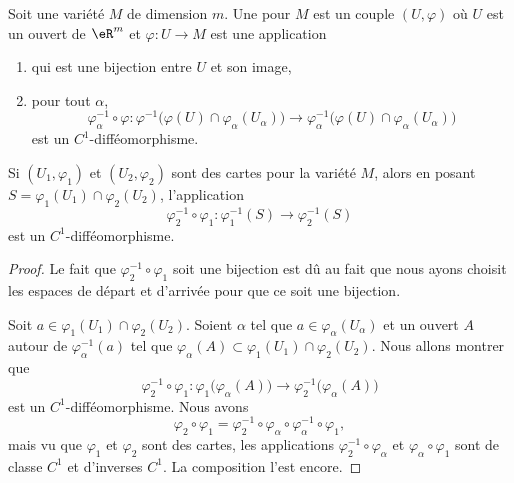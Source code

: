 \begin{definition}
    Soit une variété \( M\) de dimension \( m\). Une  pour \( M\) est un couple \( (U,\varphi)\) où \( U\) est un ouvert de \( \eR^m\) et \( \varphi\colon U\to M\) est une application
    \begin{enumerate}
        \item
            qui est une bijection entre \( U\) et son image,
        \item
    pour tout \( \alpha\),
    \begin{equation}
        \varphi_{\alpha}^{-1}\circ \varphi\colon \varphi^{-1}\big( \varphi(U)\cap\varphi_{\alpha}(U_{\alpha}) \big)\to \varphi_{\alpha}^{-1}\big( \varphi(U)\cap\varphi_{\alpha}(U_{\alpha}) \big)
    \end{equation}
    est un \( C^1\)-difféomorphisme.
    \end{enumerate}
\end{definition}

\begin{proposition}
    Si \( (U_1,\varphi_1)\) et \( (U_2,\varphi_2)\) sont des cartes pour la variété \( M\), alors en posant \( S=\varphi_1(U_1)\cap \varphi_2(U_2)\), l'application
    \begin{equation}
        \varphi_2^{-1}\circ\varphi_1\colon \varphi_1^{-1}(S)\to \varphi_2^{-1}(S)
    \end{equation}
    est un \( C^1\)-difféomorphisme.
\end{proposition}

\begin{proof}
    Le fait que \( \varphi_2^{-1}\circ\varphi_1\) soit une bijection est dû au fait que nous ayons choisit les espaces de départ et d'arrivée pour que ce soit une bijection.

    Soit \( a\in \varphi_1(U_1)\cap\varphi_2(U_2)\). Soient \( \alpha\) tel que \( a\in\varphi_{\alpha}(U_{\alpha})\) et un ouvert \( A\) autour de \( \varphi_{\alpha}^{-1}(a)\) tel que \( \varphi_{\alpha}(A)\subset \varphi_1(U_1)\cap \varphi_2(U_2)\). Nous allons montrer que
    \begin{equation}
        \varphi_2^{-1}\circ \varphi_1\colon \varphi_1\big( \varphi_{\alpha}(A) \big)\to \varphi_2^{-1}\big( \varphi_{\alpha}(A) \big)
    \end{equation}
    est un \( C^1\)-difféomorphisme. Nous avons
    \begin{equation}
        \varphi_2\circ\varphi_1=\varphi_2^{-1}\circ\varphi_{\alpha}\circ\varphi_{\alpha}^{-1}\circ\varphi_1,
    \end{equation}
    mais vu que \( \varphi_1\) et \( \varphi_2\) sont des cartes, les applications \( \varphi_2^{-1}\circ\varphi_{\alpha}\) et \( \varphi_{\alpha}\circ \varphi_1\) sont de classe \( C^1\) et d'inverses \( C^1\). La composition l'est encore.
\end{proof}


